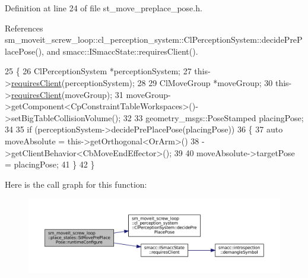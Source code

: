 Definition at line 24 of file st\+\_\+move\+\_\+preplace\+\_\+pose.\+h.



References sm\+\_\+moveit\+\_\+screw\+\_\+loop\+::cl\+\_\+perception\+\_\+system\+::\+Cl\+Perception\+System\+::decide\+Pre\+Place\+Pose(), and smacc\+::\+I\+Smacc\+State\+::requires\+Client().


\begin{DoxyCode}
25             \{
26                 ClPerceptionSystem *perceptionSystem;
27                 this->\hyperlink{classsmacc_1_1ISmaccState_a7f95c9f0a6ea2d6f18d1aec0519de4ac}{requiresClient}(perceptionSystem);
28 
29                 ClMoveGroup *moveGroup;
30                 this->\hyperlink{classsmacc_1_1ISmaccState_a7f95c9f0a6ea2d6f18d1aec0519de4ac}{requiresClient}(moveGroup);
31                 moveGroup->getComponent<CpConstraintTableWorkspaces>()->setBigTableCollisionVolume();
32 
33                 geometry\_msgs::PoseStamped placingPose;
34 
35                 \textcolor{keywordflow}{if} (perceptionSystem->decidePrePlacePose(placingPose))
36                 \{
37                     \textcolor{keyword}{auto} moveAbsolute = this->getOrthogonal<OrArm>()
38                                             ->getClientBehavior<CbMoveEndEffector>();
39 
40                     moveAbsolute->targetPose = placingPose;
41                 \}
42             \}
\end{DoxyCode}
Here is the call graph for this function\+:
\nopagebreak
\begin{figure}[H]
\begin{center}
\leavevmode
\includegraphics[width=350pt]{structsm__moveit__screw__loop_1_1place__states_1_1StMovePrePlacePose_abc507e21d3f09dae6320613a2b590430_cgraph}
\end{center}
\end{figure}
\mbox{\label{structsm__moveit__screw__loop_1_1place__states_1_1StMovePrePlacePose_a4938ba3ae66d8c8a374f9a594c6b9da3}} 

